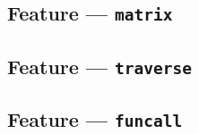 
\subsection{Feature --- \texttt{matrix}} %
\label{sub:feature_matrix}


\subsection{Feature --- \texttt{traverse}} %
\label{sub:feature_traverse}


\subsection{Feature --- \texttt{funcall}} %
\label{sub:feature_funcall}



